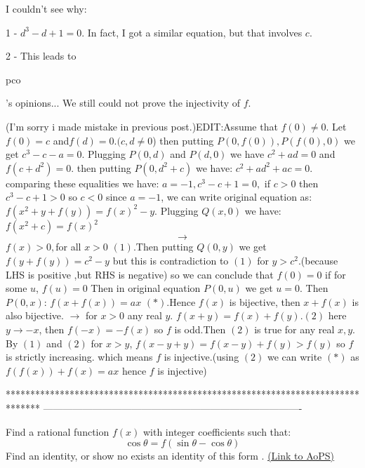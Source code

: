 \begin{solution}
	I couldn't see why: 

1 - $d^3-d+1=0$. In fact, I got a similar equation, but that involves $c$. 

2 - This leads to \begin{bolded}pco\end{bolded}'s opinions... We still could not prove the injectivity of $f$.
\end{solution}



\begin{solution}
	(I'm sorry i made mistake in previous post.)EDIT:Assume that $f(0)\neq0$. Let$f(0)=c$ and$f(d)=0$.$(c,d\neq0$) then putting $P(0,f(0)),P(f(0),0)$ we get $c^3-c-a=0$. Plugging $P(0,d)$ and  $P(d,0)$ we have $c^2+ad=0$ and $f(c+d^2)=0$. then putting $P(0,d^2+c)$ we have:  $c^2+ad^2+ac=0$.   comparing  these equalities we have: $a=-1,c^3-c+1=0,$ if $c>0$ then$c^3-c+1>0$ so $c<0$ since $a=-1$, we can write original equation as: $f(x^2+y+f(y))=f(x)^2-y$. Plugging $Q(x,0)$ we have: $f(x^2+c)=f(x)^2$ \[\rightarrow\] $f(x)>0,$for all $x>0$ $(1)$.Then putting $Q(0,y)$ we get $f(y+f(y))=c^2-y$ but this is  contradiction to $(1)$ for $y>c^2$.(because LHS is positive ,but RHS is negative) so we can conclude that $f(0)=0$ if for some $u$, $f(u)=0$  Then in original equation $P(0,u)$ we get $u=0$. Then  $P(0,x)$: $f(x+f(x))=ax$ $(*)$.Hence $f(x)$ is bijective, then $x+f(x)$ is also bijective. $\rightarrow$ for $x>0$  any real $y$. $f(x+y)=f(x)+f(y)$.$(2)$  here $y\to-x$, then $f(-x)=-f(x)$ so $f$ is odd.Then $(2)$ is true for any real $x,y$. By $(1)$  and $(2)$ for $x>y$, $f(x-y+y)=f(x-y)+f(y)>f(y)$ so $f$ is strictly increasing. which means $f$ is injective.(using $(2)$ we can write $(*)$ as $f(f(x))+f(x)=ax$ hence $f$ is injective)
\end{solution}
*******************************************************************************
-------------------------------------------------------------------------------

\begin{problem}
	Find a rational function $f(x)$ with integer coefficients such that:
\[\cos \theta = f(\sin \theta - \cos \theta)\]
Find an identity, or show no exists an identity of this form .
	\flushright \href{https://artofproblemsolving.com/community/c6h566439}{(Link to AoPS)}
\end{problem}



